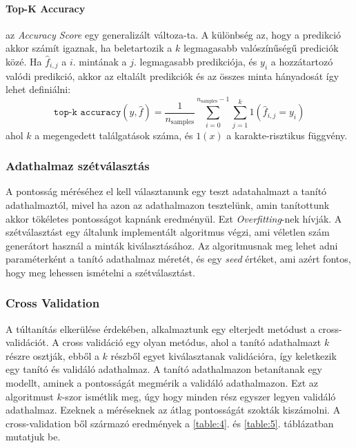 \documentclass[acmtog, authorversion]{acmart}
\begin{document}
\paragraph{Top-K Accuracy}
az \emph{Accuracy Score} egy generalizált változa-ta. A különbség az, hogy a predikció akkor számít igaznak, ha beletartozik a \begin{math}k\end{math}
legmagasabb valószínűségű prediciók közé. Ha \begin{math}\hat{f}_{i,j}\end{math} a \begin{math}i\end{math}. mintának a \begin{math}j\end{math}. legmagasabb 
predikciója, és \begin{math}y_i\end{math} a hozzátartozó valódi predikció, akkor az eltalált predikciók és az összes minta hányadosát így
lehet definiálni:
\begin{equation}
    \texttt{top-k accuracy}(y, \hat{f}) = \frac{1}{n_\text{samples}} \sum_{i=0}^{n_\text{samples}-1} \sum_{j=1}^{k} 1(\hat{f}_{i,j} = y_i)
\end{equation}
ahol \begin{math}k\end{math} a megengedett találgatások száma, és \begin{math}1(x)\end{math} a karakte-risztikus függvény.
\subsubsection{Adathalmaz szétválasztás}
A pontosság méréséhez el kell választanunk egy teszt adatahalmazt a tanító adathalmaztól, mivel ha azon az adathalmazon tesztelünk, amin tanítottunk
akkor tökéletes pontosságot kapnánk eredményül. Ezt \emph{Overfitting}-nek hívják. A szétválasztást egy általunk implementált algoritmus végzi, ami véletlen szám generátort használ a
minták kiválasztásához. Az algoritmusnak meg lehet adni paraméterként a tanító adathalmaz méretét, és egy \emph{seed} értéket, ami azért fontos, hogy meg
lehessen ismételni a szétválasztást.
\subsubsection{Cross Validation}
A túltanítás elkerülése érdekében, alkalmaztunk egy elterjedt metódust a cross-validációt. A cross validáció egy olyan metódus, ahol a tanító adathalmazt
$k$ részre osztják, ebből a $k$ részből egyet kiválasztanak validációra, így keletkezik egy tanító és validáló adathalmaz. A tanító adathalmazon betanítanak
egy modellt, aminek a pontosságát megmérik a validáló adathalmazon. Ezt az algoritmust $k$-szor ismétlik meg, úgy hogy minden rész egyszer legyen validáló
adathalmaz. Ezeknek a méréseknek az átlag pontosságát szokták kiszámolni. A cross-validation ből származó eredmények a \ref{table:4}. és \ref{table:5}. 
táblázatban mutatjuk be.
\end{document}
